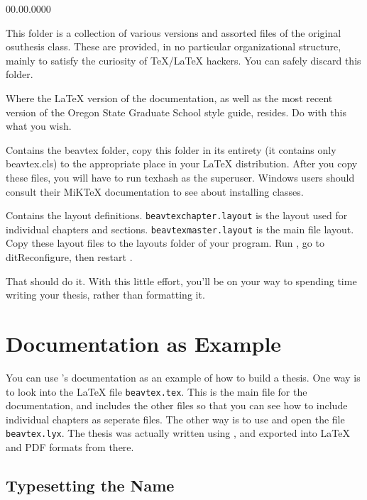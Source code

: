 \begin{lyxlist}{00.00.0000}
\item [\texttt{archive}]This folder is a collection of various versions
and assorted files of the original osuthesis class. These are provided,
in no particular organizational structure, mainly to satisfy the curiosity
of \TeX{}/\LaTeX{} hackers. You can safely discard this folder.
\item [\texttt{documentation}]Where the \LaTeX{} version of the documentation,
as well as the most recent version of the Oregon State Graduate School
style guide, resides. Do with this what you wish.
\item [\texttt{latex}]Contains the beavtex folder, copy this folder in
its entirety (it contains only beavtex.cls) to the appropriate place
in your \LaTeX{} distribution. After you copy these files, you will
have to run texhash as the superuser. Windows users should consult
their MiK\TeX{} documentation to see about installing classes.
\item [\texttt{lyx}]Contains the \LyX{} layout definitions. \texttt{beavtexchapter.layout}
is the layout used for individual chapters and sections. \texttt{beavtexmaster.layout}
is the main file layout. Copy these layout files to the layouts folder
of your \LyX{} program. Run \LyX{}, go to \textsf{}\textsf{dit\lyxarrow{}Reconfigure,}
then restart \LyX{}.
\end{lyxlist}
That should do it. With this little effort, you'll be on your way
to spending time writing your thesis, rather than formatting it.


\section{Documentation as Example}

You can use \beavtexnospace 's documentation as an example of how
to build a thesis. One way is to look into the \LaTeX{} file \texttt{beavtex.tex}.
This is the main file for the documentation, and includes the other
files so that you can see how to include individual chapters as seperate
files. The other way is to use \LyX{} and open the file \texttt{beavtex.lyx}.
The thesis was actually written using \LyX{}, and exported into \LaTeX{}
and PDF formats from there.


\subsection{Typesetting the Name}

